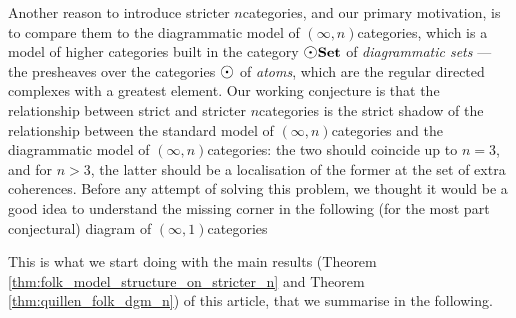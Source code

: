 Another reason to introduce stricter \( n \)\nbd categories, and our primary motivation, is to compare them to the diagrammatic model of \( (\infty, n) \)\nbd categories, which is a model of higher categories \cite{chanavat2024htpy,chanavat2024model} built in the category \( \dgmSet \) of \emph{diagrammatic sets} --- the presheaves over the categories \( \atom \) of \emph{atoms}, which are the regular directed complexes with a greatest element.  
Our working conjecture is that the relationship between strict and stricter \( n \)\nbd categories is the strict shadow of the relationship between the standard model of \( (\infty, n) \)\nbd categories \cite{barwick2020unicity} and the diagrammatic model of \( (\infty, n) \)\nbd categories: the two should coincide up to \( n = 3 \), and for \( n > 3 \), the latter should be a localisation of the former at the set of extra coherences.
Before any attempt of solving this problem, we thought it would be a good idea to understand the missing corner in the following (for the most part conjectural) diagram of \( (\infty, 1) \)\nbd categories
\begin{center}
\end{center}
This is what we start doing with the main results (Theorem \ref{thm:folk_model_structure_on_stricter_n} and Theorem \ref{thm:quillen_folk_dgm_n}) of this article, that we summarise in the following.  
